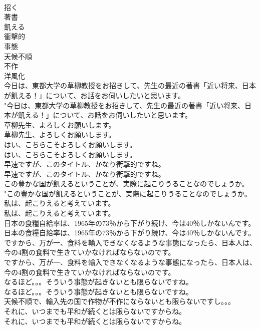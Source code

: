 \documentclass[8pt]{extreport}
\begin{document}
\begin{CJK}{UTF8}{min}
\\	招く
\\	著書
\\	飢える
\\	衝撃的
\\	事態
\\	天候不順
\\	不作
\\	洋風化
\\	今日は、東都大学の草柳教授をお招きして、先生の最近の著書「近い将来、日本が飢える！」について、お話をお伺いしたいと思います。	
\\	"今日は、東都大学の草柳教授をお招きして、先生の最近の著書「近い将来、日本が飢える！」について、お話をお伺いしたいと思います。 
\\	草柳先生、よろしくお願いします。	
\\	草柳先生、よろしくお願いします。 
\\	はい、こちらこそよろしくお願いします。	
\\	はい、こちらこそよろしくお願いします。 
\\	早速ですが、このタイトル、かなり衝撃的ですね。	
\\	早速ですが、このタイトル、かなり衝撃的ですね。 
\\	この豊かな国が飢えるということが、実際に起こりうることなのでしょうか。	
\\	"この豊かな国が飢えるということが、実際に起こりうることなのでしょうか。 
\\	私は、起こりえると考えています。	
\\	私は、起こりえると考えています。 
\\	日本の食糧自給率は、1965年の73％から下がり続け、今は40％しかないんです。	
\\	日本の食糧自給率は、1965年の73％から下がり続け、今は40％しかないんです。 
\\	ですから、万が一、食料を輸入できなくなるような事態になったら、日本人は、今の4割の食料で生きていかなければならないのです。	
\\	ですから、万が一、食料を輸入できなくなるような事態になったら、日本人は、今の4割の食料で生きていかなければならないのです。 
\\	なるほど。。。そういう事態が起きないとも限らないですね。	
\\	なるほど。。。そういう事態が起きないとも限らないですね。 
\\	天候不順で、輸入先の国で作物が不作にならないとも限らないですし。。。 
\\	それに、いつまでも平和が続くとは限らないですからね。	
\\	それに、いつまでも平和が続くとは限らないですからね。 

\end{CJK}
\end{document}
